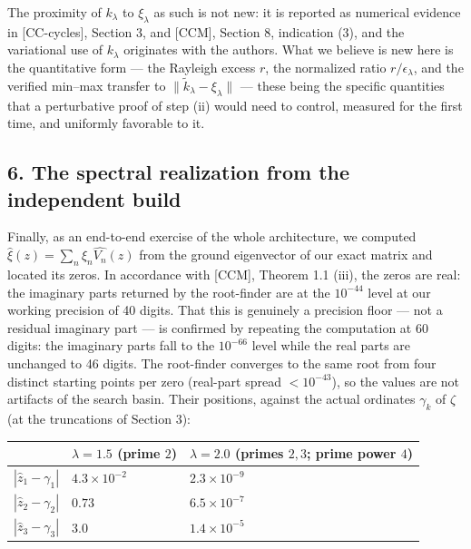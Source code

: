 \documentclass[
  letterpaper,
  11pt]{article}
\newcounter{none} %
\theoremstyle{plain}
\theoremstyle{definition}
\theoremstyle{remark}
\begin{document}
The proximity of \(k_\lambda\) to \(\xi_\lambda\) as such is not new: it is reported as numerical evidence in {[}CC-cycles{]}, Section 3, and {[}CCM{]}, Section 8, indication (3), and the variational use of \(k_\lambda\) originates with the authors. What we believe is new here is the quantitative form --- the Rayleigh excess \(r\), the normalized ratio \(r/\epsilon_\lambda\), and the verified min--max transfer to \(\|\tilde k_\lambda - \xi_\lambda\|\) --- these being the specific quantities that a perturbative proof of step (ii) would need to control, measured for the first time, and uniformly favorable to it.

\subsection{6. The spectral realization from the independent build}\label{the-spectral-realization-from-the-independent-build}

Finally, as an end-to-end exercise of the whole architecture, we computed \(\widehat\xi(z) = \sum_n \xi_n \widehat{V_n}(z)\) from the ground eigenvector of our exact matrix and located its zeros. In accordance with {[}CCM{]}, Theorem 1.1 (iii), the zeros are real: the imaginary parts returned by the root-finder are at the \(10^{-44}\) level at our working precision of 40 digits. That this is genuinely a precision floor --- not a residual imaginary part --- is confirmed by repeating the computation at 60 digits: the imaginary parts fall to the \(10^{-66}\) level while the real parts are unchanged to 46 digits. The root-finder converges to the same root from four distinct starting points per zero (real-part spread \(< 10^{-43}\)), so the values are not artifacts of the search basin. Their positions, against the actual ordinates \(\gamma_k\) of \(\zeta\) (at the truncations of Section 3):

{\def\LTcaptype{none} %
\begin{longtable}[]{@{}
  >{\raggedright\arraybackslash}p{}
  >{\raggedright\arraybackslash}p{}
  >{\raggedright\arraybackslash}p{}@{}}
\toprule\noalign{}
\begin{minipage}[b]{\linewidth}\raggedright
\end{minipage} & \begin{minipage}[b]{\linewidth}\raggedright
\(\lambda = 1.5\) (prime \(2\))
\end{minipage} & \begin{minipage}[b]{\linewidth}\raggedright
\(\lambda = 2.0\) (primes \(2,3\); prime power \(4\))
\end{minipage} \\
\midrule\noalign{}
\endhead
\bottomrule\noalign{}
\endlastfoot
\(|\hat z_1 - \gamma_1|\) & \(4.3\times10^{-2}\) & \(2.3\times10^{-9}\) \\
\(|\hat z_2 - \gamma_2|\) & \(0.73\) & \(6.5\times10^{-7}\) \\
\(|\hat z_3 - \gamma_3|\) & \(3.0\) & \(1.4\times10^{-5}\) \\
\end{longtable}
}
\end{document}
